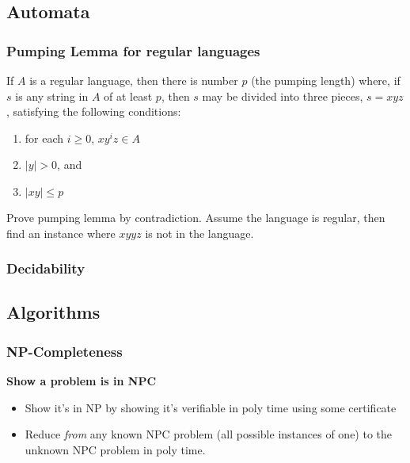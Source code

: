 \documentclass[7pt]{article}
\begin{document}
\begin{multicols*}{4}
\subsection*{Automata}

\subsubsection*{Pumping Lemma for regular languages}
If $A$ is a regular language, then there is number $p$ (the pumping length) where, if $s$ is any string in $A$ of at least $p$, then $s$ may be divided into three pieces, $s = xyz$, satisfying the following conditions:
\begin{enumerate}
\item for each $i \geq 0$, $xy^iz \in A$
\item $|y| > 0$, and
\item $|xy| \leq p$
\end{enumerate}

Prove pumping lemma by contradiction.  Assume the language is regular, then find an instance where $xyyz$ is not in the language.

\subsubsection*{Decidability}


\subsection*{Algorithms}
\subsubsection*{NP-Completeness}
{\bf Show a problem is in NPC}
\begin{itemize}
\item Show it's in NP by showing it's verifiable in poly time using
  some certificate
\item Reduce \emph{from} any known NPC problem (all possible instances
  of one) to the unknown NPC problem in poly time.
\end{itemize}


\end{multicols*}
\end{document}
